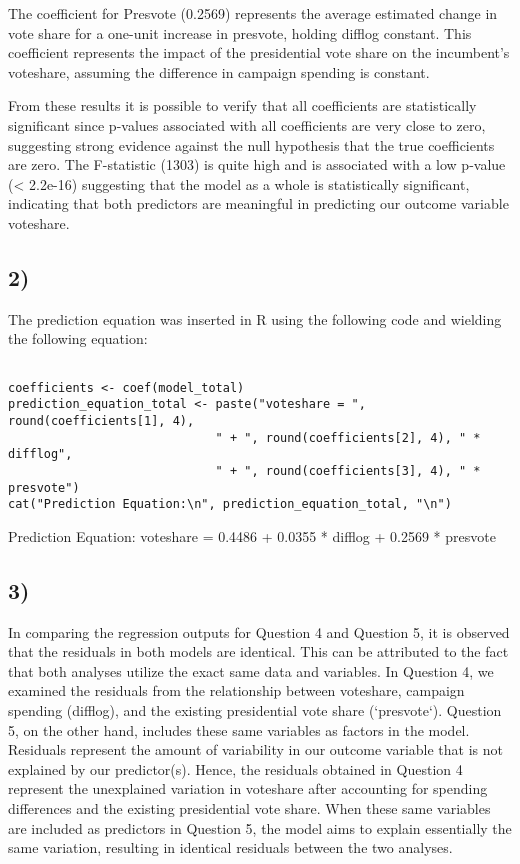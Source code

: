 \documentclass[oneside]{article}
\begin{document}
The coefficient for Presvote (0.2569) represents the average estimated change in vote share for a one-unit increase in presvote, holding difflog constant. This coefficient represents the impact of the presidential vote share on the incumbent's voteshare, assuming the difference in campaign spending is constant.

From these results it is possible to verify that all coefficients are statistically significant since p-values associated with all coefficients are very close to zero, suggesting strong evidence against the null hypothesis that the true coefficients are zero.
The F-statistic (1303) is quite high and is associated with a low p-value (< 2.2e-16) suggesting that the model as a whole is statistically significant, indicating that both predictors are meaningful in predicting our outcome variable voteshare.

\subsection*{2)}
The prediction equation was inserted in R using the following code and wielding the following equation:
\begin{verbatim}

coefficients <- coef(model_total)
prediction_equation_total <- paste("voteshare = ", round(coefficients[1], 4), 
                             " + ", round(coefficients[2], 4), " * difflog",
                             " + ", round(coefficients[3], 4), " * presvote")
cat("Prediction Equation:\n", prediction_equation_total, "\n")

\end{verbatim}
Prediction Equation:
 voteshare =  0.4486  +  0.0355  * difflog  +  0.2569  * presvote 

\subsection*{3)}
In comparing the regression outputs for Question 4 and Question 5, it is observed that the residuals in both models are identical. This can be attributed to the fact that both analyses utilize the exact same data and variables. In Question 4, we examined the residuals from the relationship between voteshare, campaign spending (difflog), and the existing presidential vote share (`presvote`). Question 5, on the other hand, includes these same variables as factors in the model.
Residuals represent the amount of variability in our outcome variable that is not explained by our predictor(s). Hence, the residuals obtained in Question 4 represent the unexplained variation in voteshare after accounting for spending differences and the existing presidential vote share. When these same variables are included as predictors in Question 5, the model aims to explain essentially the same variation, resulting in identical residuals between the two analyses.
\end{document}
